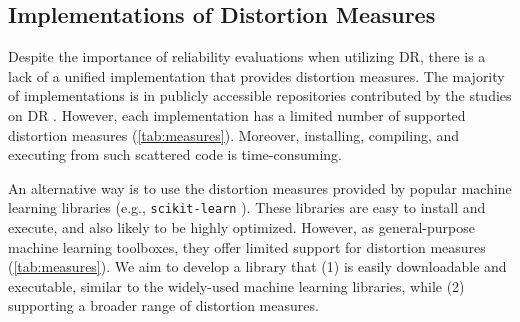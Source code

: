 \subsection{Implementations of Distortion Measures}

Despite the importance of reliability evaluations when utilizing DR, there is a lack of a unified implementation that provides distortion measures. The majority of implementations is in publicly accessible repositories contributed by the studies on DR \cite{mcinnes2020arxiv, fujiwara23pvis, cockburn09cs, moor20icml, jeon22vis}. However, each implementation has a limited number of supported distortion measures (\autoref{tab:measures}). Moreover, installing, compiling, and executing from such scattered code is time-consuming.


An alternative way is to use the distortion measures provided by popular machine learning libraries (e.g., \texttt{scikit-learn} \cite{pedregosa11jmlr}). These libraries are easy to install and execute, and also likely to be highly optimized. However, as general-purpose machine learning toolboxes, they offer limited support for distortion measures (\autoref{tab:measures}). We aim to develop a library that (1) is easily downloadable and executable, similar to the widely-used machine learning libraries, while (2) supporting a broader range of distortion measures.





